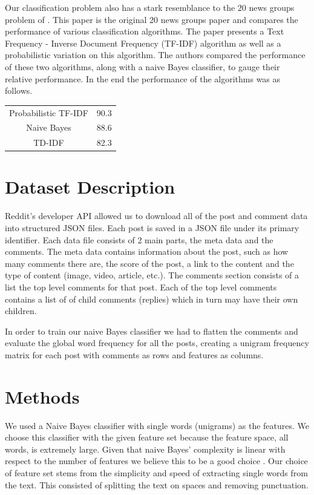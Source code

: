 \documentclass[10pt,twocolumn]{article}
\begin{document}
Our classification problem also has a stark resemblance to the 20 news groups problem of \cite{joachims1996probabilistic}. This paper is the original 20 news groups paper and compares the performance of various classification algorithms. The paper presents a Text Frequency - Inverse Document Frequency (TF-IDF) algorithm as well as a probabilistic variation on this algorithm. The authors compared the performance of these two algorithms, along with a naive Bayes classifier, to gauge their relative performance. In the end the performance of the algorithms was as follows.
\\

\begin{center}
\begin{tabular}{|c|c|}
\hline
Probabilistic TF-IDF & 90.3 \\
Naive Bayes & 88.6 \\
TD-IDF & 82.3 \\
\hline
\end{tabular}
\end{center}

\section{Dataset Description}

Reddit's developer API allowed us to download all of the post and comment data into structured JSON files. Each post is saved in a JSON file under its primary identifier. Each data file consists of 2 main parts, the meta data and the comments. The meta data contains information about the post, such as how many comments there are, the score of the post, a link to the content and the type of content (image, video, article, etc.). The comments section consists of a list the top level comments for that post. Each of the top level comments contains a list of of child comments (replies) which in turn may have their own children. 

In order to train our naive Bayes classifier we had to flatten the comments and evaluate the global word frequency for all the posts, creating a unigram frequency matrix for each post with comments as rows and features as columns.

\section{Methods}

We used a Naive Bayes classifier with single words (unigrams) as the features. We choose this classifier with the given feature set because the feature space, all words, is extremely large. Given that naive Bayes' complexity is linear with respect to the number of features we believe this to be a good choice \cite{hastie2009elements}. Our choice of feature set stems from the simplicity and speed of extracting single words from the text. This consisted of splitting the text on spaces and removing punctuation. 
\end{document}
